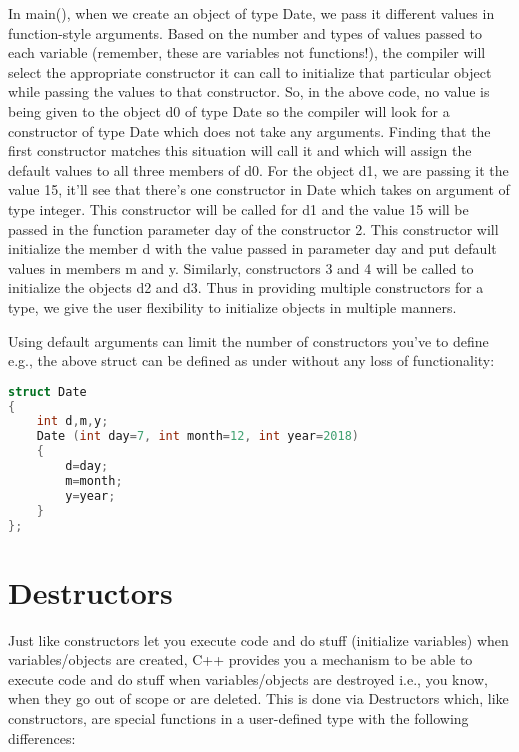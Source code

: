 \documentclass[11pt,fleqn]{book} %
\begin{document}
\noindent In main(), when we create an object of type Date, we pass it different values in function-style arguments. Based on the number and types of values passed to each variable (remember, these are variables not functions!), the compiler will select the appropriate constructor it can call to initialize that particular object while passing the values to that constructor. So, in the above code, no value is being given to the object d0 of type Date so the compiler will look for a constructor of type Date which does not take any arguments. Finding that the first constructor matches this situation will call it and which will assign the default values to all three members of d0. For the object d1, we are passing it the value 15, it'll see that there's one constructor in Date which takes on argument of type integer. This constructor will be called for d1 and the value 15 will be passed in the function parameter day of the constructor 2. This constructor will initialize the member d with the value passed in parameter day and put default values in members m and y. Similarly, constructors 3 and 4 will be called to initialize the objects d2 and d3. Thus in providing multiple constructors for a type, we give the user flexibility to initialize objects in multiple manners.

Using default arguments can limit the number of constructors you've to define e.g., the above struct can be defined as under without any loss of functionality:
\begin{lstlisting}[language=C++, caption = Default arguments]
struct Date 
{
	int d,m,y;
	Date (int day=7, int month=12, int year=2018)
	{
		d=day;
		m=month;
		y=year;
	}
};
\end{lstlisting}



\section{Destructors}
Just like constructors let you execute code and do stuff (initialize variables) when variables/objects are created, C++ provides you a mechanism to be able to execute code and do stuff when variables/objects are destroyed i.e., you know, when they go out of scope or are deleted. This is done via Destructors which, like constructors, are special functions in a user-defined type with the following differences:
\end{document}
